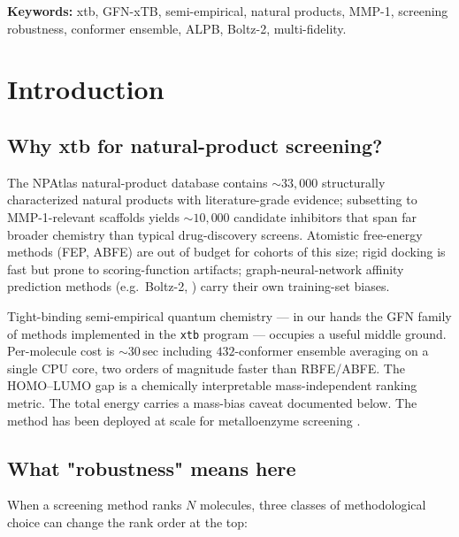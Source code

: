 \documentclass[11pt,a4paper]{article}
\begin{document}
\noindent\textbf{Keywords:} xtb, GFN-xTB, semi-empirical, natural products,
MMP-1, screening robustness, conformer ensemble, ALPB, Boltz-2,
multi-fidelity.

\section{Introduction}
\label{sec:intro}

\subsection{Why xtb for natural-product screening?}

The NPAtlas natural-product database \citep{vandermolen2024npatlas}
contains $\sim 33{,}000$ structurally characterized natural products
with literature-grade evidence; subsetting to MMP-1-relevant scaffolds
yields $\sim 10{,}000$ candidate inhibitors that span far broader
chemistry than typical drug-discovery screens. Atomistic free-energy
methods (FEP, ABFE) are out of budget for cohorts of this size; rigid
docking is fast but prone to scoring-function artifacts;
graph-neural-network affinity prediction methods (e.g.\ Boltz-2,
\citealp{boltz2_2024}) carry their own training-set biases.

Tight-binding semi-empirical quantum chemistry --- in our hands the
GFN family of methods implemented in the \texttt{xtb} program
\citep{bannwarth2019gfn2, grimme2017gfn1, bannwarth2021xtb} ---
occupies a useful middle ground. Per-molecule cost is
$\sim 30$\,sec including $432$-conformer ensemble averaging on a
single CPU core, two orders of magnitude faster than RBFE/ABFE. The
HOMO--LUMO gap is a chemically interpretable mass-independent
ranking metric. The total energy carries a mass-bias caveat
documented below. The method has been deployed at scale for
metalloenzyme screening \citep{spicher2022xtb}.

\subsection{What "robustness" means here}

When a screening method ranks $N$ molecules, three classes of
methodological choice can change the rank order at the top:
\end{document}
